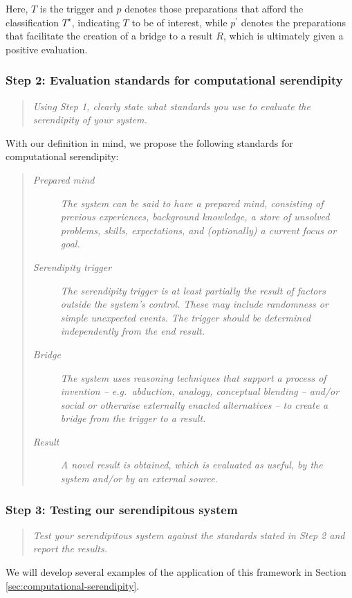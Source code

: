 Here, $T$ is the trigger and $p$ denotes those preparations that afford the
classification $T^\star$, indicating $T$ to be of interest, while
$p^{\prime}$ denotes the preparations that facilitate the creation of a
bridge to a result $R$, which is ultimately given a positive
evaluation.

\subsubsection*{ Step 2: Evaluation standards for computational serendipity}
\begin{quote} {\em Using Step 1, clearly state what standards you use to evaluate the serendipity of your
    system. }\end{quote}

With our definition in mind, we propose the following standards for
computational serendipity:

\begin{quote}
\begin{description}
\item[\emph{Prepared mind}] \emph{The system can be said to have a
  prepared mind, consisting of previous experiences, background
  knowledge, a store of unsolved problems, skills, expectations, and
  (optionally) a current focus or goal.}
\item[\emph{Serendipity trigger}] \emph{The serendipity trigger is at
  least partially the result of factors outside the system's control.
  These may include randomness or simple unexpected events.  The
  trigger should be determined independently from the end result.}
\item[\emph{Bridge}] \emph{The system uses reasoning techniques
  that support a process of invention -- e.g.~abduction, analogy,
  conceptual blending -- and/or social or otherwise externally enacted
  alternatives -- to create a bridge from the trigger to a result.}
\item[\emph{Result}] \emph{A novel result is obtained, which is
  evaluated as useful, by the system and/or by an external source.}
\end{description}
\end{quote}

\subsubsection*{Step 3: Testing our serendipitous system}

\begin{quote} {\em Test your serendipitous system against the standards stated in Step 2 and report the
results.}\end{quote}

We will develop several examples of the application of this framework
in Section \ref{sec:computational-serendipity}.

